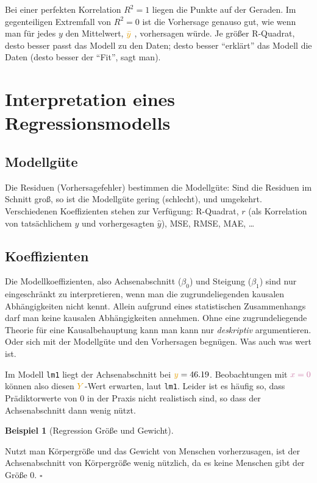 \documentclass[
  letterpaper,
  twoside,
  open=any]{scrbook}
\theoremstyle{definition}
\theoremstyle{definition}
\newtheorem{example}{Beispiel}[chapter]
\theoremstyle{definition}
\theoremstyle{remark}
\begin{document}
Bei einer perfekten Korrelation \(R^2=1\) liegen die Punkte auf der
Geraden. Im gegenteiligen Extremfall von \(R^2=0\) ist die Vorhersage
genauso gut, wie wenn man für jedes \(y\) den Mittelwert,
{\(\color{ycol}{\bar{y}}\)} , vorhersagen würde. Je größer R-Quadrat,
desto besser passt das Modell zu den Daten; desto besser
\enquote{erklärt} das Modell die Daten (desto besser der \enquote{Fit},
sagt man).

\section{Interpretation eines
Regressionsmodells}\label{sec-interpret-reg-mod}

\subsection{Modellgüte}\label{modellguxfcte-1}

Die Residuen (Vorhersagefehler) bestimmen die Modellgüte: Sind die
Residuen im Schnitt groß, so ist die Modellgüte gering (schlecht), und
umgekehrt. Verschiedenen Koeffizienten stehen zur Verfügung: R-Quadrat,
\(r\) (als Korrelation von tatsächlichem \(y\) und vorhergesagten
\(\hat{y}\)), MSE, RMSE, MAE, \ldots{}

\subsection{Koeffizienten}\label{koeffizienten}

Die Modellkoeffizienten, also Achsenabschnitt (\(\beta_0\)) und Steigung
(\(\beta_1\)) sind nur eingeschränkt zu interpretieren, wenn man die
zugrundeliegenden kausalen Abhängigkeiten nicht kennt. Allein aufgrund
eines statistischen Zusammenhangs darf man keine kausalen Abhängigkeiten
annehmen. Ohne eine zugrundeliegende Theorie für eine Kausalbehauptung
kann man kann nur \emph{deskriptiv} argumentieren. Oder sich mit der
Modellgüte und den Vorhersagen begnügen. Was auch was wert ist.

{Im Modell \texttt{lm1} liegt der Achsenabschnitt bei
\(\textcolor{ycol}{y}=46.19\). Beobachtungen mit \(\color{xcol}{x}=0\)
können also diesen \(\textcolor{ycol}{Y}\)-Wert erwarten, laut
\texttt{lm1}.} Leider ist es häufig so, dass Prädiktorwerte von 0 in der
Praxis nicht realistisch sind, so dass der Achsenabschnitt dann wenig
nützt.

\begin{example}[Regression Größe und
Gewicht]\protect\hypertarget{exm-groesse}{}\label{exm-groesse}

Nutzt man Körpergröße und das Gewicht von Menschen vorherzusagen, ist
der Achsenabschnitt von Körpergröße wenig nützlich, da es keine Menschen
gibt der Größe 0. \(\square\)

\end{example}
\end{document}
